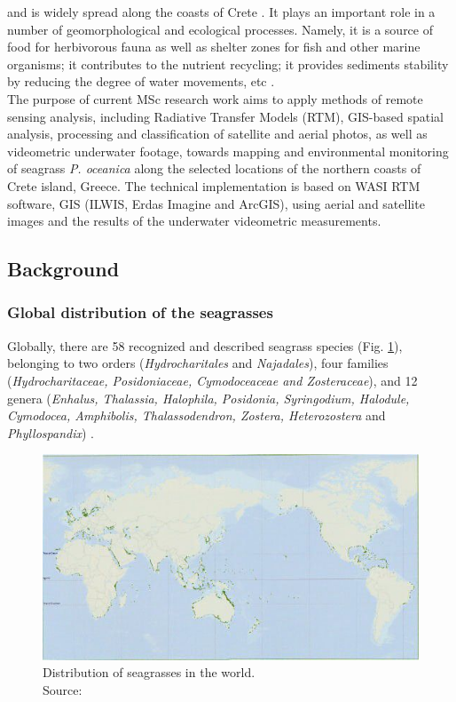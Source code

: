 \documentclass[10pt, a4paper]{article}
\begin{document}
and is widely spread along the coasts of Crete \cite{Dumay02} \label{Dumay02}. 
It plays an important role in a number
of geomorphological and ecological processes. Namely, it is a source of food for herbivorous fauna as
well as shelter zones for fish and other marine organisms; it contributes to the nutrient recycling; it
provides sediments stability by reducing the degree of water movements, etc \cite{Francour99}\label{Francour99}.\\
The purpose of current MSc research work aims to apply methods of remote sensing analysis, including Radiative Transfer Models (RTM), 
GIS-based spatial analysis, processing and classification of satellite and aerial photos, as well as videometric underwater footage, towards mapping and environmental monitoring of seagrass \textit{P. oceanica} along the selected locations of the northern coasts of Crete island, Greece. The technical implementation is based on WASI RTM software, GIS (ILWIS, Erdas Imagine and ArcGIS), using aerial and satellite images and the results of the underwater videometric measurements. 

\subsection{Background}
\subsubsection{Global distribution of the seagrasses}
Globally, there are 58 recognized and described seagrass species (Fig. \ref{fig:2}), belonging to two orders
(\textit{Hydrocharitales} and \textit{Najadales}), four families (\textit{Hydrocharitaceae, Posidoniaceae, Cymodoceaceae
and Zosteraceae}), and 12 genera (\textit{Enhalus, Thalassia, Halophila, Posidonia, Syringodium, Halodule,
Cymodocea, Amphibolis, Thalassodendron, Zostera, Heterozostera} and \textit{Phyllospandix}) \cite{Kuo89}\label{Kuo89}.

\begin{figure}
	\centering
	\includegraphics[scale=0.25]{Fig-1-2.jpg}
	\caption{Distribution of seagrasses in the world.\\ Source:\cite{Green03}\label{Green03} 
	\label{fig:2}} 
\end{figure}
\end{document}
